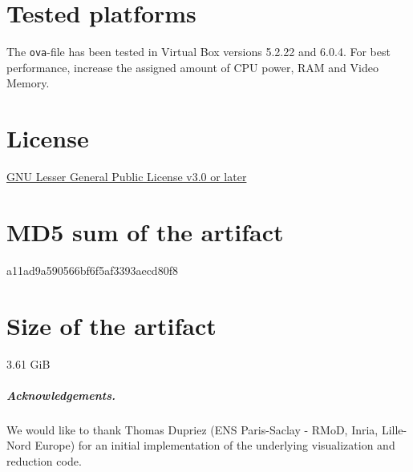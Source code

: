 \documentclass[a4paper,UKenglish]{darts-v2019}
\newenvironment{platforms}{\section{Tested platforms}}{}
\newcommand{\license}[1]{{\section{License}#1}}
\newcommand{\mdsum}[1]{{\section{MD5 sum of the artifact}#1}}
\newcommand{\artifactsize}[1]{{\section{Size of the artifact}#1}}
\begin{document}
\begin{platforms}

The \texttt{ova}-file has been tested in Virtual Box versions 5.2.22 and
6.0.4. For best performance, increase the assigned amount of CPU power, RAM and Video Memory.

\end{platforms}

\license{\href{http://www.gnu.org/licenses/lgpl-3.0.html}{GNU Lesser General Public License v3.0 or later}}

\mdsum{a11ad9a590566bf6f5af3393aecd80f8}

\artifactsize{3.61 GiB}

\subparagraph*{Acknowledgements.}

We would like to thank Thomas Dupriez (ENS Paris-Saclay - RMoD, Inria, Lille-Nord Europe) for an initial implementation of the underlying visualization and reduction code.






%

\end{document}
